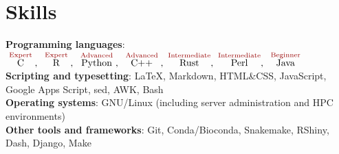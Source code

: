 \documentclass[letterpaper,10.5pt]{article}
\begin{document}

\section{Skills}

\textbf{Programming languages}:
$\overset{\textcolor{isored}{\text{   Expert   }}}{\text{C}},\ \overset{\textcolor{isored}{\text{   Expert   }}}{\text{R}},\
\overset{\textcolor{isored}{\text{  Advanced  }}}{\text{Python}},\ \overset{\textcolor{isored}{\text{  Advanced  }}}{\text{C++}},\
\overset{\textcolor{isored}{\text{Intermediate}}}{\text{Rust}},\
\overset{\textcolor{isored}{\text{Intermediate}}}{\text{Perl}},\  
\overset{\textcolor{isored}{\text{  Beginner  }}}{\text{Java}}$ \\
\smallskip
\textbf{Scripting and typesetting}: \LaTeX, Markdown, HTML\&CSS, JavaScript, Google Apps Script, sed, AWK, Bash \\
\smallskip
\textbf{Operating systems}: GNU/Linux (including server administration and HPC environments) \\
\smallskip
\textbf{Other tools and frameworks}: Git,  Conda/Bioconda, Snakemake, RShiny, Dash, Django, Make \smallskip



\end{document}

